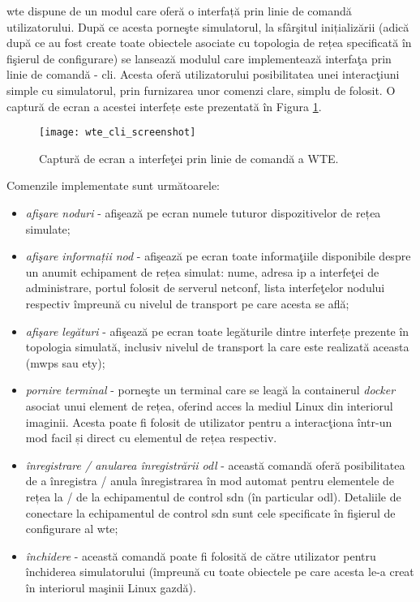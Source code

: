 \gls{wte} dispune de un modul care oferă o interfață prin linie de comandă utilizatorului. După ce acesta porneşte simulatorul, la sfârşitul inițializării (adică după ce au fost create toate obiectele asociate cu topologia de rețea specificată în fişierul de configurare) se lansează modulul care implementează interfaţa prin linie de comandă - \gls{cli}. Acesta oferă utilizatorului posibilitatea unei interacţiuni simple cu simulatorul, prin furnizarea unor comenzi clare, simplu de folosit. O captură de ecran a acestei interfețe este prezentată în Figura \ref{fig:wte_cli_screenshot}.

\begin{figure}[h]
	\centering
	\texttt{[image: wte\_cli\_screenshot]}
	\caption{Captură de ecran a interfeţei prin linie de comandă a WTE.}
	\label{fig:wte_cli_screenshot}
\end{figure}

Comenzile implementate sunt următoarele:
\begin{itemize}
	\item \textit{afişare noduri} - afişează pe ecran numele tuturor dispozitivelor de rețea simulate;
	\item \textit{afişare informații nod} - afişează pe ecran toate informaţiile disponibile despre un anumit echipament de rețea simulat: nume, adresa \gls{ip} a interfeţei de administrare, portul folosit de serverul \gls{netconf}, lista interfeţelor nodului respectiv împreună cu nivelul de transport pe care acesta se află;
	\item \textit{afişare legături} - afişează pe ecran toate legăturile dintre interfețe prezente în topologia simulată, inclusiv nivelul de transport la care este realizată aceasta (\gls{mwps} sau \gls{ety});
	\item \textit{pornire terminal} - porneşte un terminal care se leagă la containerul \textit{docker} asociat unui element de rețea, oferind acces la mediul Linux din interiorul imaginii. Acesta poate fi folosit de utilizator pentru a interacţiona într-un mod facil și direct cu elementul de rețea respectiv.
	\item \textit{înregistrare / anularea înregistrării \gls{odl}} - această comandă oferă posibilitatea de a înregistra / anula înregistrarea în mod automat pentru elementele de rețea la / de la echipamentul de control \gls{sdn} (în particular \gls{odl}). Detaliile de conectare la echipamentul de control \gls{sdn} sunt cele specificate în fişierul de configurare al \gls{wte};
	\item \textit{închidere} - această comandă poate fi folosită de către utilizator pentru închiderea simulatorului (împreună cu toate obiectele pe care acesta le-a creat în interiorul maşinii Linux gazdă).
\end{itemize}

